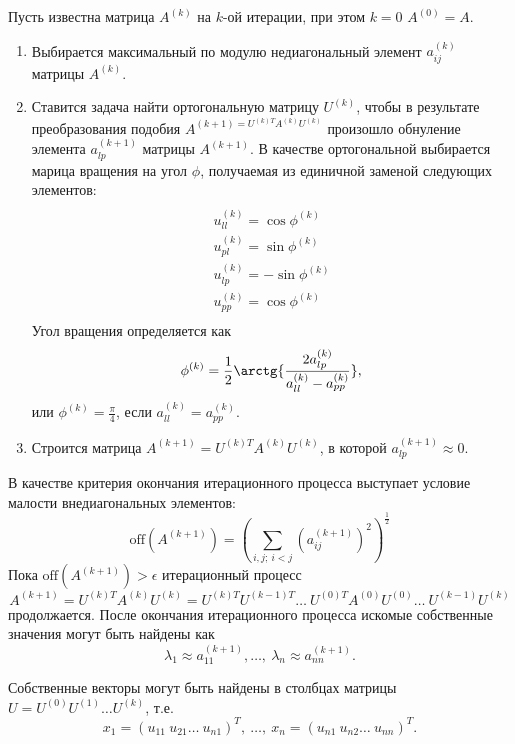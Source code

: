 \documentclass[a4paper,12pt]{article}
\begin{document}
Пусть известна матрица $A^{(k)}$ на $k$-ой итерации, при этом
$k = 0$ $A^{(0)} = A$.
\begin{enumerate}
    \item Выбирается максимальный по модулю недиагональный
    элемент $a_{ij}^{(k)}$ матрицы $A^{(k)}$.
    \item Ставится задача найти ортогональную матрицу $U^{(k)}$,
    чтобы в результате преобразования подобия
    $A^{(k + 1) = U^{(k) T} A^{(k)} U^{(k)}}$
    произошло обнуление элемента $a_{lp}^{(k + 1)}$
    матрицы $A^{(k + 1)}$. В качестве ортогональной выбирается
    марица вращения на угол $\phi$, получаемая из единичной
    заменой следующих элементов:
    \begin{multline}
    \\
    u^{(k)}_{ll} = \cos{\phi^{(k)}} \\
    u^{(k)}_{pl} = \sin{\phi^{(k)}} \\
    u^{(k)}_{lp} = -\sin{\phi^{(k)}} \\
    u^{(k)}_{pp} = \cos{\phi^{(k)}} \\
    \end{multline}
    Угол вращения определяется как
    $$
    \phi^{(k)} = \frac{1}{2}\arctg{\frac{2a_{lp}^{(k)}}{a_{ll}^{(k)} - a_{pp}^{(k)}}},
    $$
    или $\phi^{(k)} = \frac{\pi}{4}$, если $a_{ll}^{(k)} = a_{pp}^{(k)}$.

    \item Строится матрица $A^{(k + 1)} = U^{(k)T} A^{(k)} U^{(k)}$,
        в которой $a_{lp}^{(k + 1)} \approx 0$.
\end{enumerate}

В качестве критерия окончания итерационного процесса выступает условие
малости внедиагональных элементов:
$$
\text{off}(A^{(k + 1)}) = (\sum_{i,j;\ i < j} (a_{ij}^{(k + 1)})^2)^{\frac{1}{2}}
$$
Пока $\text{off}(A^{(k + 1)}) > \epsilon$ итерационный процесс
$$
A^{(k + 1)} = U^{(k)T} A^{(k)} U^{(k)} = U^{(k)T} U^{(k - 1)T} \ldots\ U^{(0)T} A^{(0)}
U^{(0)} \ldots\ U^{(k - 1)} U^{(k)}
$$
продолжается. После окончания итерационного процесса искомые
собственные значения могут быть найдены как
$$
\lambda_1 \approx a_{11}^{(k + 1)}, \ldots,\ \lambda_n \approx a_{nn}^{(k + 1)}.
$$

Собственные векторы могут быть найдены в столбцах матрицы
$U = U^{(0)} U^{(1)} \ldots U^{(k)}$, т.е.
$$
x_1 = (u_{11}\ u_{21} \ldots\ u_{n1})^{T},\ \ldots,\ x_n = (u_{n1}\ u_{n2} \ldots\ u_{nn})^{T}.
$$
\end{document}
